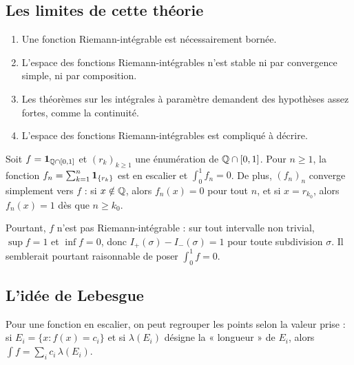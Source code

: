 \documentclass[11pt]{article}
\begin{document}
\subsection*{Les limites de cette théorie}

\begin{enumerate}
  \item Une fonction Riemann-intégrable est nécessairement bornée.
  \item L'espace des fonctions Riemann-intégrables n'est stable ni par convergence simple, ni par composition.
  \item Les théorèmes sur les intégrales à paramètre demandent des hypothèses assez fortes, comme la continuité.
  \item L'espace des fonctions Riemann-intégrables est compliqué à décrire.
\end{enumerate}

\begin{exemple}
Soit $f = \mathbf{1}_{\mathbb{Q}\cap[0,1]}$ et $(r_k)_{k\geq 1}$ une énumération de $\mathbb{Q} \cap [0,1]$. Pour $n \geq 1$, la fonction $f_n = \sum_{k=1}^n \mathbf{1}_{\{r_k\}}$ est en escalier et $\int_0^1 f_n = 0$. De plus, $(f_n)_n$ converge simplement vers $f$ : si $x \notin \mathbb{Q}$, alors $f_n(x) = 0$ pour tout $n$, et si $x = r_{k_0}$, alors $f_n(x) = 1$ dès que $n \geq k_0$.

Pourtant, $f$ n'est pas Riemann-intégrable : sur tout intervalle non trivial, $\sup f = 1$ et $\inf f = 0$, donc $I_+(\sigma) - I_-(\sigma) = 1$ pour toute subdivision $\sigma$. Il semblerait pourtant raisonnable de poser $\int_0^1 f = 0$.
\end{exemple}

\subsection*{L'idée de Lebesgue}

Pour une fonction en escalier, on peut regrouper les points selon la valeur prise : si $E_i = \{x : f(x) = c_i\}$ et si $\lambda(E_i)$ désigne la « longueur » de $E_i$, alors $\int f = \sum_i c_i\,\lambda(E_i)$.
\end{document}
